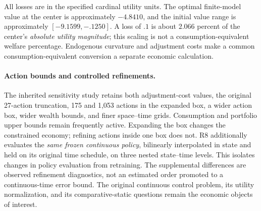 All losses are in the specified cardinal utility units. The optimal finite-model value at the center is approximately $-4.8410$, and the initial value range is approximately $[-9.1599,-.1250]$. A loss of $.1$ is about $2.066$ percent of the center's \emph{absolute utility magnitude}; this scaling is not a consumption-equivalent welfare percentage. Endogenous curvature and adjustment costs make a common consumption-equivalent conversion a separate economic calculation.

\paragraph*{Action bounds and controlled refinements.}
The inherited sensitivity study retains both adjustment-cost values, the original 27-action truncation, 175 and 1,053 actions in the expanded box, a wider action box, wider wealth bounds, and finer space--time grids. Consumption and portfolio upper bounds remain frequently active. Expanding the box changes the constrained economy; refining actions inside one box does not. R8 additionally evaluates the \emph{same frozen continuous policy}, bilinearly interpolated in state and held on its original time schedule, on three nested state--time levels. This isolates changes in policy evaluation from retraining. The supplemental differences are observed refinement diagnostics, not an estimated order promoted to a continuous-time error bound. The original continuous control problem, its utility normalization, and its comparative-static questions remain the economic objects of interest.

